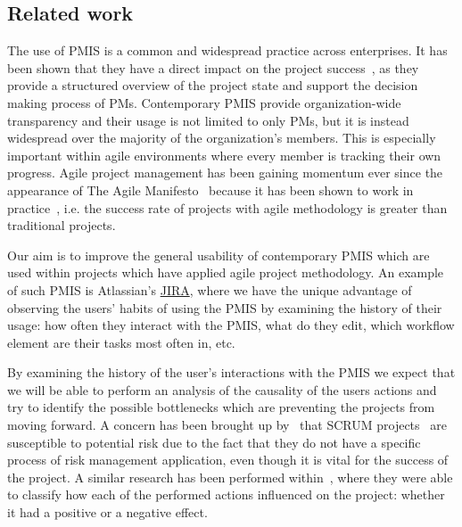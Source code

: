 \documentclass[a4paper, 12pt]{article}
\begin{document}
\subsection{Related work}



The use of PMIS is a common and widespread practice across enterprises. It has been shown that they have a direct impact on the project success~\cite{RAYMOND2008213}, as they provide a structured overview of the project state and support the decision making process of PMs. Contemporary PMIS provide organization-wide transparency and their usage is not limited to only PMs, but it is instead widespread over the majority of the organization's members. This is especially important within agile environments where every member is tracking their own progress. Agile project management has been gaining momentum ever since the appearance of The Agile Manifesto~\cite{alliance2001agile} because it has been shown to work in practice~\cite{SERRADOR20151040}, i.e. the success rate of projects with agile methodology is greater than traditional projects. 

Our aim is to improve the general usability of contemporary PMIS which are used within projects which have applied agile project methodology. An example of such PMIS is Atlassian's \href{https://www.atlassian.com/software/jira}{JIRA}, where we have the unique advantage of observing the users' habits of using the PMIS by examining the history of their usage: how often they interact with the PMIS, what do they edit, which workflow element are their tasks most often in, etc.

By examining the history of the user's interactions with the PMIS we expect that we will be able to perform an analysis of the causality of the users actions and try to identify the possible bottlenecks which are preventing the projects from moving forward. A concern has been brought up by~\cite{tavares2019risk} that SCRUM projects~\cite{sutherland2013scrum} are susceptible to potential risk due to the fact that they do not have a specific process of risk management application, even though it is vital for the success of the project. A similar research has been performed within~\cite{Toole2006APM}, where they were able to classify how each of the performed actions influenced on the project: whether it had a positive or a negative effect.
\end{document}
